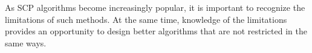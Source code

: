 \documentclass[letterpaper, 10 pt, conference]{ieeeconf}
\begin{document}
As SCP algorithms become increasingly popular, it is important to recognize the limitations of such methods. At the same time, knowledge of the limitations provides an opportunity to design better algorithms that are not restricted in the same ways.


















\end{document}
